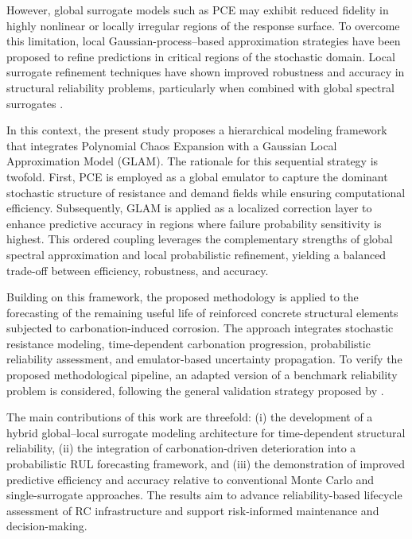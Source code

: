 However, global surrogate models such as PCE may exhibit reduced fidelity in highly nonlinear or locally irregular regions of the response surface. To overcome this limitation, local Gaussian-process–based approximation strategies have been proposed to refine predictions in critical regions of the stochastic domain. Local surrogate refinement techniques have shown improved robustness and accuracy in structural reliability problems, particularly when combined with global spectral surrogates \citep{search17surrogate2017}. 

In this context, the present study proposes a hierarchical modeling framework that integrates Polynomial Chaos Expansion with a Gaussian Local Approximation Model (GLAM). The rationale for this sequential strategy is twofold. First, PCE is employed as a global emulator to capture the dominant stochastic structure of resistance and demand fields while ensuring computational efficiency. Subsequently, GLAM is applied as a localized correction layer to enhance predictive accuracy in regions where failure probability sensitivity is highest. This ordered coupling leverages the complementary strengths of global spectral approximation and local probabilistic refinement, yielding a balanced trade-off between efficiency, robustness, and accuracy.

Building on this framework, the proposed methodology is applied to the forecasting of the remaining useful life of reinforced concrete structural elements subjected to carbonation-induced corrosion. The approach integrates stochastic resistance modeling, time-dependent carbonation progression, probabilistic reliability assessment, and emulator-based uncertainty propagation. To verify the proposed methodological pipeline, an adapted version of a benchmark reliability problem is considered, following the general validation strategy proposed by \citet{pires_reliability_2024}. 

The main contributions of this work are threefold: (i) the development of a hybrid global–local surrogate modeling architecture for time-dependent structural reliability, (ii) the integration of carbonation-driven deterioration into a probabilistic RUL forecasting framework, and (iii) the demonstration of improved predictive efficiency and accuracy relative to conventional Monte Carlo and single-surrogate approaches. The results aim to advance reliability-based lifecycle assessment of RC infrastructure and support risk-informed maintenance and decision-making.






